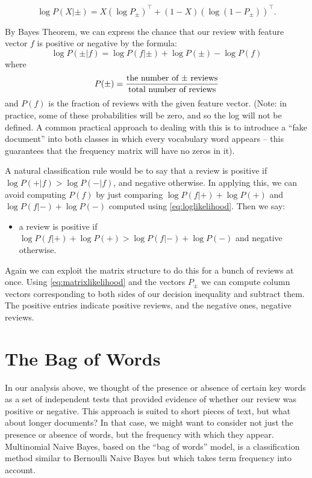 \documentclass[
  oneside]{scrbook}
\providecommand{\tightlist}{%
  \setlength{\itemsep}{0pt}\setlength{\parskip}{0pt}}
\renewcommand{\rm}{}
\begin{document}
\begin{equation}
\log P(X|\pm) = X(\log P_{\pm})^{\intercal}+(1-X)(\log (1-P_{\pm}))^{\intercal}.
\label{eq:matrixlikelihood}\end{equation}

By Bayes Theorem, we can express the chance that our review with feature
vector \(f\) is positive or negative by the formula: \[
\log P(\pm|f) = \log P(f|\pm)+\log P(\pm) - \log P(f)
\] where \[
P(\pm) = \frac{\hbox{\rm the number of $\pm$ reviews}}{\hbox{\rm total number of reviews}}
\] and \(P(f)\) is the fraction of reviews with the given feature
vector. (Note: in practice, some of these probabilities will be zero,
and so the log will not be defined. A common practical approach to
dealing with this is to introduce a ``fake document'' into both classes
in which every vocabulary word appears -- this guarantees that the
frequency matrix will have no zeros in it).

A natural classification rule would be to say that a review is positive
if \(\log P(+|f)>\log P(-|f)\), and negative otherwise. In applying
this, we can avoid computing \(P(f)\) by just comparing
\(\log P(f|+)+\log P(+)\) and \(\log P(f|-)+\log P(-)\) computed using
\cref{eq:loglikelihood}. Then we say:

\begin{itemize}
\tightlist
\item
  a review is positive if
  \(\log P(f|+)+\log P(+)>\log P(f|-)+\log P(-)\) and negative
  otherwise.
\end{itemize}

Again we can exploit the matrix structure to do this for a bunch of
reviews at once. Using \cref{eq:matrixlikelihood} and the vectors
\(P_{\pm}\) we can compute column vectors corresponding to both sides of
our decision inequality and subtract them. The positive entries indicate
positive reviews, and the negative ones, negative reviews.

\hypertarget{the-bag-of-words}{%
\section{The Bag of Words}\label{the-bag-of-words}}

In our analysis above, we thought of the presence or absence of certain
key words as a set of independent tests that provided evidence of
whether our review was positive or negative. This approach is suited to
short pieces of text, but what about longer documents? In that case, we
might want to consider not just the presence or absence of words, but
the frequency with which they appear. Multinomial Naive Bayes, based on
the ``bag of words'' model, is a classification method similar to
Bernoulli Naive Bayes but which takes term frequency into account.
\end{document}
